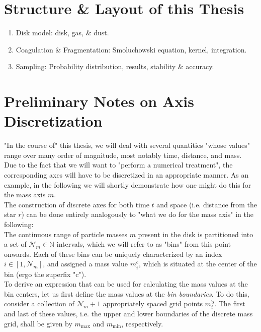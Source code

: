 \section{Structure \& Layout of this Thesis}

    \begin{enumerate}
        \item Disk model: disk, gas, \& dust.
        \item Coagulation \& Fragmentation: Smoluchowski equation, kernel, integration.
        \item Sampling: Probability distribution, results, stability \& accuracy.
    \end{enumerate}

\newpage
\section{Preliminary Notes on Axis Discretization}

    "In the course of" this thesis, we will deal with several quantities "whose values" range over 
    many order of magnitude, most notably time, distance, and mass. \\

    Due to the fact that we will want to "perform a numerical treatment", the corresponding axes 
    will have to be discretized in an appropriate manner. As an example, in the following we will 
    shortly demonstrate how one might do this for the mass axis $m$. \\

    The construction of discrete axes for both time $t$ and space (i.e. distance from the star $r$)
    can be done entirely analogously to "what we do for the mass axis" in the following: \\

    The continuous range of particle masses $m$ present in the disk is partitioned into a set of 
    $\mathcal N_m\in\mathbb N$ intervals, which we will refer to as "bins" from this point onwards. 
    Each of these bins can be uniquely characterized by an index $i\in[1,\mathcal N_m]$, and 
    assigned a mass value $m_i^\text{c}$, which is situated at the center of the bin 
    (ergo the superfix "c").\\
    
    To derive an expression that can be used for calculating the mass values at the bin centers, let us 
    first define the mass values at the \textit{bin boundaries}. To do this, consider a collection of 
    $\mathcal N_m+1$ appropriately spaced grid points $m_i^\text{b}$. The first and last of these 
    values, i.e. the upper and lower boundaries of the discrete mass grid, shall be given by 
    $m_\text{max}$ and $m_\text{min}$, respectively. \\

